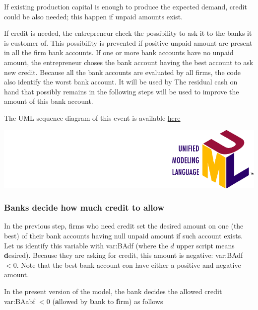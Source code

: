 \documentclass{book}
\newcommand{\doclocation}{file:///Users/giulioni/Documents/workspace/gabriele/docs}
\begin{document}
If existing production capital is enough to produce the expected demand, credit could be also needed; this happen if unpaid amounts exist.

If credit is needed, the entrepreneur check the possibility to ask it to the banks it is customer of. This possibility is prevented if positive unpaid amount are present in all the firm bank accounts. If one or more bank accounts have no unpaid amount, the entrepreneur choses the bank account having the best account to ask new credit. Because all the bank accounts are evaluated by all firms, the code also identify the worst bank account. It will be used by The residual cash on hand that possibly remains in the following steps will be used to improve the amount of this bank account. 

The UML sequence diagram of this event is available \href{\doclocation/umldoc/setDesiredCredit.html}{here}
\begin{marginfigure}
	\includegraphics[scale=0.1]{uml.png}
\end{marginfigure}

\subsubsection{Banks decide how much credit to allow}

In the previous step, firms who need credit set the desired amount on one (the best) of their bank accounts having null unpaid amount if such account exists. Let us identify this variable with \gls{var:BAdf} (where the $d$ upper script means \textbf desired). Because they are asking for credit, this amount is negative: \gls{var:BAdf} $<0$. Note that the best bank account con have either a positive and negative amount. 

In the present version of the model, the bank decides the allowed credit \gls{var:BAabf} $<0$ (\textbf allowed by \textbf bank to \textbf firm) as follows
\end{document}
